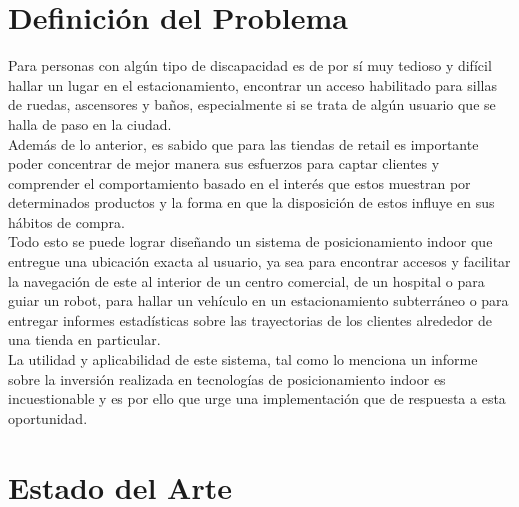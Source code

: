 \section{Definición del Problema}


Para personas con algún tipo de discapacidad es de por sí muy tedioso y difícil hallar un lugar en el estacionamiento, encontrar un acceso habilitado para sillas de ruedas, ascensores y baños, especialmente si se trata de algún usuario que se halla de paso en la ciudad.\\

Además de lo anterior, es sabido que para las tiendas de retail es importante poder concentrar de mejor manera sus esfuerzos para captar clientes y comprender el comportamiento basado en el interés que estos muestran por determinados productos y la forma en que la disposición de estos influye en sus hábitos de compra.\\

Todo esto se puede lograr diseñando un sistema de posicionamiento indoor que entregue una ubicación exacta al usuario, ya sea para encontrar accesos y facilitar la navegación de este al interior de un centro comercial, de un hospital o para guiar un robot, para hallar un vehículo en un estacionamiento subterráneo o para entregar informes estadísticas sobre las trayectorias de los clientes alrededor de una tienda en particular.\\

La utilidad y aplicabilidad de este sistema, tal como lo menciona un informe  sobre la inversión realizada en tecnologías de posicionamiento indoor es incuestionable y es por ello que urge una implementación que de respuesta a esta oportunidad.


\section{Estado del Arte}

